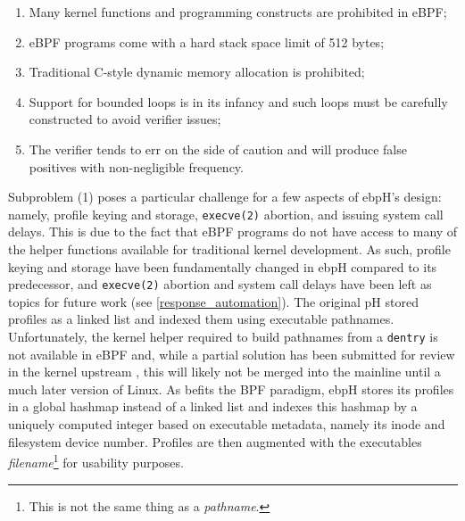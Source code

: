 \documentclass[
  12pt]{findlay}
\newcommand{\passthrough}[1]{#1}
\providecommand{\tightlist}{\setlength{\itemsep}{0pt}\setlength{\parskip}{0pt}}
\begin{document}
\begin{enumerate}
\def\labelenumi{\arabic{enumi})}
\tightlist
\item
  Many kernel functions and programming constructs are prohibited in
  eBPF;
\item
  eBPF programs come with a hard stack space limit of 512 bytes;
\item
  Traditional C-style dynamic memory allocation is prohibited;
\item
  Support for bounded loops is in its infancy and such loops must be
  carefully constructed to avoid verifier issues;
\item
  The verifier tends to err on the side of caution and will produce
  false positives with non-negligible frequency.
\end{enumerate}

Subproblem (1) poses a particular challenge for a few aspects of ebpH's
design: namely, profile keying and storage,
\passthrough{\lstinline!execve(2)!} abortion, and issuing system call
delays. This is due to the fact that eBPF programs do not have access to
many of the helper functions available for traditional kernel
development. As such, profile keying and storage have been fundamentally
changed in ebpH compared to its predecessor, and
\passthrough{\lstinline!execve(2)!} abortion and system call delays have
been left as topics for future work (see \autoref{response_automation}).
The original pH \autocite{soma02} stored profiles as a linked list and
indexed them using executable pathnames. Unfortunately, the kernel
helper required to build pathnames from a
\passthrough{\lstinline!dentry!} is not available in eBPF and, while a
partial solution has been submitted for review in the kernel upstream
\autocite{zhang19}, this will likely not be merged into the mainline
until a much later version of Linux. As befits the BPF paradigm, ebpH
stores its profiles in a global hashmap instead of a linked list and
indexes this hashmap by a uniquely computed integer based on executable
metadata, namely its inode and filesystem device number. Profiles are
then augmented with the executables \emph{filename}\footnote{This is
not the same thing as a \emph{pathname}.} for usability purposes.
\end{document}
